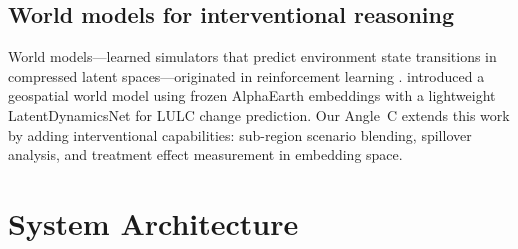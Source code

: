 \documentclass{article}
\begin{document}
\subsection{World models for interventional reasoning}

World models---learned simulators that predict environment state transitions in compressed latent spaces---originated in reinforcement learning \citep{ha2018world, hafner2023dreamerv3}. \citet{zhou2026worldmodel} introduced a geospatial world model using frozen AlphaEarth embeddings with a lightweight LatentDynamicsNet for LULC change prediction. Our Angle~C extends this work by adding interventional capabilities: sub-region scenario blending, spillover analysis, and treatment effect measurement in embedding space.


\section{System Architecture}
\label{sec:architecture}
\end{document}
